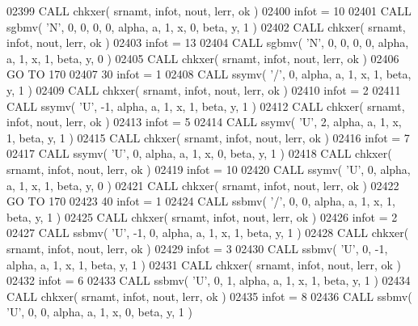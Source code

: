 \begin{DoxyCode}
02399       \textcolor{keyword}{CALL }chkxer( srnamt, infot, nout, lerr, ok )
02400       infot = 10
02401       \textcolor{keyword}{CALL }sgbmv( \textcolor{stringliteral}{'N'}, 0, 0, 0, 0, alpha, a, 1, x, 0, beta, y, 1 )
02402       \textcolor{keyword}{CALL }chkxer( srnamt, infot, nout, lerr, ok )
02403       infot = 13
02404       \textcolor{keyword}{CALL }sgbmv( \textcolor{stringliteral}{'N'}, 0, 0, 0, 0, alpha, a, 1, x, 1, beta, y, 0 )
02405       \textcolor{keyword}{CALL }chkxer( srnamt, infot, nout, lerr, ok )
02406       \textcolor{keywordflow}{GO TO} 170
02407    30 infot = 1
02408       \textcolor{keyword}{CALL }ssymv( \textcolor{stringliteral}{'/'}, 0, alpha, a, 1, x, 1, beta, y, 1 )
02409       \textcolor{keyword}{CALL }chkxer( srnamt, infot, nout, lerr, ok )
02410       infot = 2
02411       \textcolor{keyword}{CALL }ssymv( \textcolor{stringliteral}{'U'}, -1, alpha, a, 1, x, 1, beta, y, 1 )
02412       \textcolor{keyword}{CALL }chkxer( srnamt, infot, nout, lerr, ok )
02413       infot = 5
02414       \textcolor{keyword}{CALL }ssymv( \textcolor{stringliteral}{'U'}, 2, alpha, a, 1, x, 1, beta, y, 1 )
02415       \textcolor{keyword}{CALL }chkxer( srnamt, infot, nout, lerr, ok )
02416       infot = 7
02417       \textcolor{keyword}{CALL }ssymv( \textcolor{stringliteral}{'U'}, 0, alpha, a, 1, x, 0, beta, y, 1 )
02418       \textcolor{keyword}{CALL }chkxer( srnamt, infot, nout, lerr, ok )
02419       infot = 10
02420       \textcolor{keyword}{CALL }ssymv( \textcolor{stringliteral}{'U'}, 0, alpha, a, 1, x, 1, beta, y, 0 )
02421       \textcolor{keyword}{CALL }chkxer( srnamt, infot, nout, lerr, ok )
02422       \textcolor{keywordflow}{GO TO} 170
02423    40 infot = 1
02424       \textcolor{keyword}{CALL }ssbmv( \textcolor{stringliteral}{'/'}, 0, 0, alpha, a, 1, x, 1, beta, y, 1 )
02425       \textcolor{keyword}{CALL }chkxer( srnamt, infot, nout, lerr, ok )
02426       infot = 2
02427       \textcolor{keyword}{CALL }ssbmv( \textcolor{stringliteral}{'U'}, -1, 0, alpha, a, 1, x, 1, beta, y, 1 )
02428       \textcolor{keyword}{CALL }chkxer( srnamt, infot, nout, lerr, ok )
02429       infot = 3
02430       \textcolor{keyword}{CALL }ssbmv( \textcolor{stringliteral}{'U'}, 0, -1, alpha, a, 1, x, 1, beta, y, 1 )
02431       \textcolor{keyword}{CALL }chkxer( srnamt, infot, nout, lerr, ok )
02432       infot = 6
02433       \textcolor{keyword}{CALL }ssbmv( \textcolor{stringliteral}{'U'}, 0, 1, alpha, a, 1, x, 1, beta, y, 1 )
02434       \textcolor{keyword}{CALL }chkxer( srnamt, infot, nout, lerr, ok )
02435       infot = 8
02436       \textcolor{keyword}{CALL }ssbmv( \textcolor{stringliteral}{'U'}, 0, 0, alpha, a, 1, x, 0, beta, y, 1 )

\end{DoxyCode}
